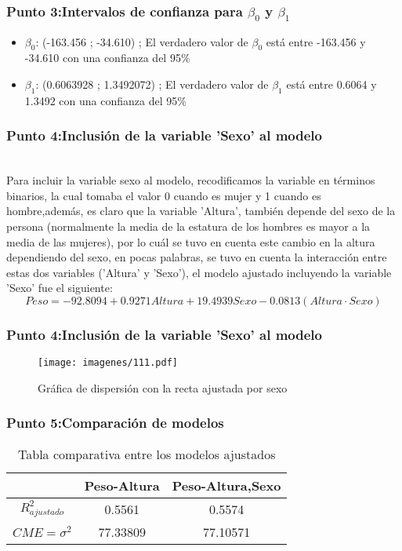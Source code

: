 \documentclass[12pt]{beamer}
\begin{document}
\begin{frame}
\frametitle{Punto 3:Intervalos de confianza para $\beta_{0}$ y $\beta_{1}$}
\begin{itemize}
\item $\beta_{0}$: (-163.456 ; -34.610)  ; El verdadero valor de $\beta_{0}$ está entre -163.456 y -34.610 con una confianza del 95\%
\item $\beta_{1}$: (0.6063928 ; 1.3492072) ; El verdadero valor de $\beta_{1}$ está entre 0.6064 y 1.3492 con una confianza del 95\%
\end{itemize}

\end{frame}
\begin{frame}
\frametitle{Punto 4:Inclusión de la variable 'Sexo' al modelo}
~\\ Para incluir la variable sexo al modelo, recodificamos la variable en términos binarios, la cual tomaba el valor 0 cuando es mujer y 1 cuando es hombre,además, es claro que la variable 'Altura', también depende del sexo de la persona (normalmente la media de la estatura de los hombres es mayor a la media de las mujeres), por lo cuál se tuvo en cuenta este cambio en la altura dependiendo del sexo, en pocas palabras, se tuvo en cuenta la interacción entre estas dos variables ('Altura' y 'Sexo'), el modelo ajustado incluyendo la variable 'Sexo' fue el siguiente:
~\\ $$Peso=-92.8094+0.9271 Altura+ 19.4939 Sexo -0.0813(Altura\cdot Sexo)$$
\end{frame}

\begin{frame}
\frametitle{Punto 4:Inclusión de la variable 'Sexo' al modelo}
\begin{figure}[!h]
    \begin{center}
        \texttt{[image: imagenes/111.pdf]}
        \caption{Gráfica de dispersión con la recta ajustada por sexo}
        \label{fig:Densidad}
    \end{center}
\end{figure}
\end{frame}


\begin{frame}
\frametitle{Punto 5:Comparación de modelos}
\begin{table}[!htb]
\caption{Tabla comparativa entre los modelos ajustados}\label{Tabla1}
\begin{center}
\begin{tabular}{ccc}
\hline
 & Peso-Altura & Peso-Altura,Sexo \\ 
\hline
$R^2_{ajustado}$ & 0.5561 & 0.5574 \\ 
 
$CME=\sigma^2$ & 77.33809 & 77.10571 \\ 
\hline 
\end{tabular}
\end{center}
\end{table}
\end{frame}
\end{document}
